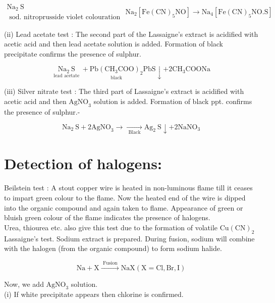 \documentclass[10pt]{article}
\begin{document}
$$
\begin{gathered}
\mathrm{Na}_{2} \mathrm{~S} \\
\text { sod. nitroprusside violet colouration }
\end{gathered} \mathrm{Na}_{2}\left[\mathrm{Fe}(\mathrm{CN})_{5} \mathrm{NO}\right] \longrightarrow \mathrm{Na}_{4}\left[\mathrm{Fe}(\mathrm{CN})_{5} \mathrm{NO} . \mathrm{S}\right]
$$

(ii) Lead acetate test : The second part of the Lassaigne's extract is acidified with acetic acid and then lead acetate solution is added. Formation of black precipitate confirms the presence of sulphur.

$$
\underset{\text { lead acetate }}{\mathrm{Na}_{2} \mathrm{~S}}+\underset{\text { black }}{\mathrm{Pb}\left(\mathrm{CH}_{3} \mathrm{COO}\right)_{2}} \mathrm{PbS} \downarrow+2 \mathrm{CH}_{3} \mathrm{COONa}
$$

(iii) Silver nitrate test : The third part of Lassaigne's extract is acidified with acetic acid and then $\mathrm{AgNO}_{3}$ solution is added. Formation of black ppt. confirms the presence of sulphur.-

$$
\mathrm{Na}_{2} \mathrm{~S}+2 \mathrm{AgNO}_{3} \longrightarrow \underset{\text { Black }}{\longrightarrow} \mathrm{Ag}_{2} \mathrm{~S} \downarrow+2 \mathrm{NaNO}_{3}
$$

\section*{Detection of halogens:}
Beilstein test : A stout copper wire is heated in non-luminous flame till it ceases to impart green colour to the flame. Now the heated end of the wire is dipped into the organic compound and again taken to flame. Appearance of green or bluish green colour of the flame indicates the presence of halogens.\\
Urea, thiourea etc. also give this test due to the formation of volatile $\mathrm{Cu}(\mathrm{CN})_{2}$\\
Lassaigne's test. Sodium extract is prepared. During fusion, sodium will combine with the halogen (from the organic compound) to form sodium halide.

$$
\mathrm{Na}+\mathrm{X} \xrightarrow{\text { Fusion }} \mathrm{NaX}(\mathrm{X}=\mathrm{Cl}, \mathrm{Br}, \mathrm{I})
$$

Now, we add $\mathrm{AgNO}_{3}$ solution.\\
(i) If white precipitate appears then chlorine is confirmed.
\end{document}

